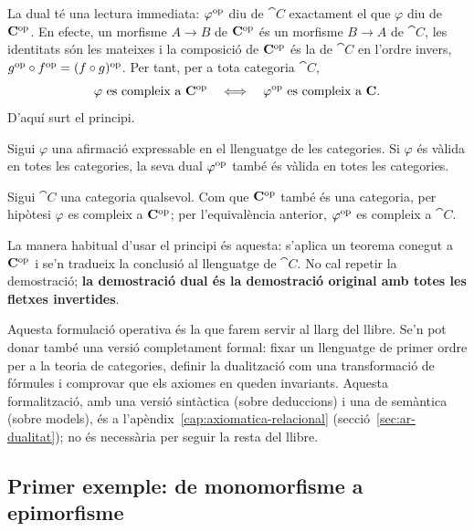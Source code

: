 La dual té una lectura immediata: $\varphi^{\mathrm{op}}$ diu de $\cat{C}$ exactament el que $\varphi$ diu de $\mathbf{C}^{\mathrm{op}}$. En efecte, un morfisme $A\to B$ de $\mathbf{C}^{\mathrm{op}}$ és un morfisme $B\to A$ de $\cat{C}$, les identitats són les mateixes i la composició de $\mathbf{C}^{\mathrm{op}}$ és la de $\cat{C}$ en l'ordre invers, $g^{\mathrm{op}}\circ f^{\mathrm{op}}=(f\circ g)^{\mathrm{op}}$. Per tant, per a tota categoria $\cat{C}$,
\[
\varphi \text{ es compleix a } \mathbf{C}^{\mathrm{op}}
\quad\Longleftrightarrow\quad
\varphi^{\mathrm{op}} \text{ es compleix a } \mathbf{C}.
\]
D'aquí surt el principi.

\begin{teorema}\label{teo:dualitat}
Sigui $\varphi$ una afirmació expressable en el llenguatge de les categories. Si $\varphi$ és vàlida en totes les categories, la seva dual $\varphi^{\mathrm{op}}$ també és vàlida en totes les categories.
\end{teorema}

\begin{prova}
Sigui $\cat{C}$ una categoria qualsevol. Com que $\mathbf{C}^{\mathrm{op}}$ també és una categoria, per hipòtesi $\varphi$ es compleix a $\mathbf{C}^{\mathrm{op}}$; per l'equivalència anterior, $\varphi^{\mathrm{op}}$ es compleix a $\cat{C}$.
\end{prova}

La manera habitual d'usar el principi és aquesta: s'aplica un teorema conegut a $\mathbf{C}^{\mathrm{op}}$ i se'n tradueix la conclusió al llenguatge de $\cat{C}$. No cal repetir la demostració; \textbf{la demostració dual és la demostració original amb totes les fletxes invertides}.

Aquesta formulació operativa és la que farem servir al llarg del llibre. Se'n pot donar també una versió completament formal: fixar un llenguatge de primer ordre per a la teoria de categories, definir la dualització com una transformació de fórmules i comprovar que els axiomes en queden invariants. Aquesta formalització, amb una versió sintàctica (sobre deduccions) i una de semàntica (sobre models), és a l'apèndix~\ref{cap:axiomatica-relacional} (secció~\ref{sec:ar-dualitat}); no és necessària per seguir la resta del llibre.

\subsection{Primer exemple: de monomorfisme a epimorfisme}

